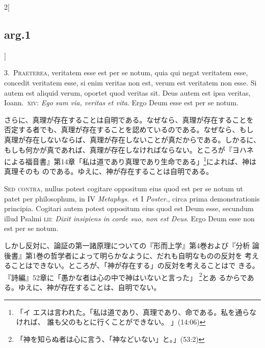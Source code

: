 \documentclass[paper=a4paper,fontsize=10pt,jafontsize=9pt,titlepage]{jlreq}
\begin{document}
\begin{paracol}{2}[\subsection{arg.1}]

3.~{\scshape Praeterea}, veritatem esse est per se notum, quia qui negat
veritatem esse, concedit veritatem esse, si enim veritas non est,
verum est veritatem non esse. Si autem est aliquid verum, oportet quod
veritas sit. Deus autem est ipsa veritas, Ioann.~{\scshape xiv}: {\itshape Ego
sum via, veritas et vita}. Ergo Deum esse est per se notum.

\switchcolumn

さらに、真理が存在することは自明である。なぜなら、真理が存在することを
否定する者でも、真理が存在することを認めているのである。なぜなら、もし
真理が存在しないならば、真理が存在しないことが真だからである。しかるに、
もしも何かが真であれば、真理が存在しなければならない。ところが『ヨハネ
による福音書』第14章「私は道であり真理であり生命である」\footnote{「イ
エスは言われた。「私は道であり、真理であり、命である。私を通らなければ、
誰も父のもとに行くことができない。 」(14:06)}によれば、神は真理そのも
のである。ゆえに、神が存在することは自明である。

\switchcolumn*[\subsection{s.c.}]

{\scshape Sed contra}, nullus potest cogitare oppositum eius quod est per
se notum ut patet per philosophum, in IV {\itshape Metaphys}.~et I {\itshape
Poster}., circa prima demonstrationis principia. Cogitari autem potest
oppositum eius quod est Deum esse, secundum illud Psalmi {\scshape lii}:
{\itshape Dixit insipiens in corde suo, non est Deus}. Ergo Deum esse non
est per se notum.

\switchcolumn

しかし反対に、論証の第一諸原理についての『形而上学』第4巻および『分析
論後書』第1巻の哲学者によって明らかなように、だれも自明なものの反対を
考えることはできない。ところが、「神が存在する」の反対を考えることはで
きる。『詩編』52章に「愚かな者は心の中で神はいないと言った」
\footnote{「神を知らぬ者は心に言う、「神などいない」と。」(53:2)}とあ
るからである。ゆえに、神が存在することは、自明でない。



\end{paracol}
\end{document}

